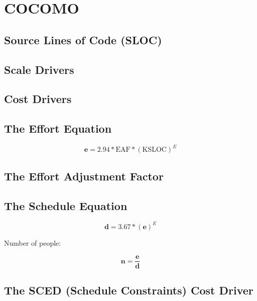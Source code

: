 \section{COCOMO}


\subsection{Source Lines of Code (SLOC)}


\subsection{Scale Drivers}


\subsection{Cost Drivers}


\subsection{The Effort Equation}

\begin{equation}
\mathbf{e} = 2.94 * \text{EAF} * {\left(\text{KSLOC}\right)}^E
\end{equation}


\subsection{The Effort Adjustment Factor}



\subsection{The Schedule Equation}

\begin{equation}
\mathbf{d} = 3.67 * {\left(\mathbf{e}\right)}^E
\end{equation}


Number of people:

\begin{equation}
\mathbf{n} = \frac{\mathbf{e}}{\mathbf{d}}
\end{equation}


\subsection{The SCED (Schedule Constraints) Cost Driver}









